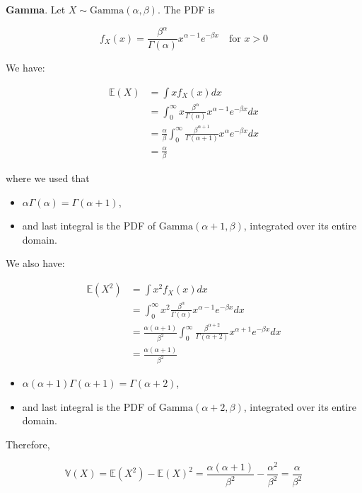 \textbf{Gamma}. Let \(X \sim \text{Gamma}(\alpha, \beta)\). The PDF is

\[ f_X(x) = \frac{\beta^\alpha}{\Gamma(\alpha)} x^{\alpha - 1} e^{-\beta x} \quad \text{for } x > 0 \]

We have:

\begin{align*}
\mathbb{E}(X) 
&= \int x f_X(x) dx \\
&= \int_{0}^{\infty} x \frac{\beta^\alpha}{\Gamma(\alpha)} x^{\alpha - 1} e^{-\beta x} dx \\
&= \frac{\alpha}{\beta} \int_{0}^{\infty}\frac{\beta^{\alpha + 1}}{\Gamma(\alpha + 1)} x^\alpha e^{-\beta x} dx \\
&= \frac{\alpha}{\beta}
\end{align*}

where we used that

\begin{itemize}[tightlist]
\item
  \(\alpha \Gamma(\alpha) = \Gamma(\alpha + 1)\),
\item
  and last integral is the PDF of \(\text{Gamma}(\alpha + 1, \beta)\),
  integrated over its entire domain.
\end{itemize}

We also have:

\begin{align*}
\mathbb{E}(X^{2}) 
&= \int x^{2} f_X(x) dx \\
&= \int_{0}^{\infty} x^{2} \frac{\beta^\alpha}{\Gamma(\alpha)} x^{\alpha - 1} e^{-\beta x} dx \\
&= \frac{\alpha (\alpha + 1)}{\beta^{2}} \int_{0}^{\infty}\frac{\beta^{\alpha + 2}}{\Gamma(\alpha + 2)} x^{\alpha + 1} e^{-\beta x} dx \\
&= \frac{\alpha (\alpha + 1)}{\beta^{2}}
\end{align*}

\begin{itemize}[tightlist]
\item
  \(\alpha (\alpha + 1) \Gamma(\alpha + 1) = \Gamma(\alpha + 2)\),
\item
  and last integral is the PDF of \(\text{Gamma}(\alpha + 2, \beta)\),
  integrated over its entire domain.
\end{itemize}

Therefore,

\[ \mathbb{V}(X) = \mathbb{E}(X^{2}) - \mathbb{E}(X)^{2} = \frac{\alpha (\alpha + 1)}{\beta^{2}} - \frac{\alpha^{2}}{\beta^{2}} = \frac{\alpha}{\beta^{2}} \]


